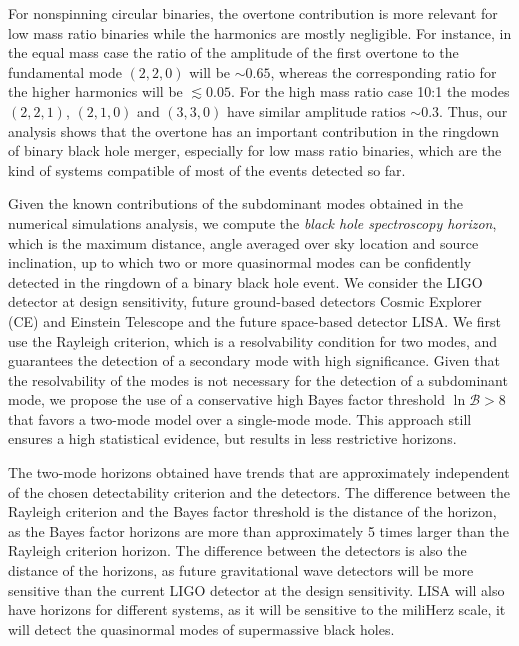 \documentclass[a4paper]{article}
\begin{document}
For nonspinning circular binaries, the overtone contribution is more relevant for low mass ratio binaries while the harmonics are mostly negligible. For instance, in the equal mass case the ratio of the amplitude of the first overtone to the fundamental mode $(2,2,0)$ will be $\sim 0.65$, whereas the corresponding ratio for the higher harmonics will be $\lesssim 0.05$. For the high mass ratio case 10:1 the modes $(2,2,1)$, $(2,1,0)$ and $(3,3,0)$ have similar amplitude ratios $\sim 0.3$.
Thus, our analysis shows that the overtone has an important contribution in the ringdown of binary black hole merger, especially for low mass ratio binaries, which are the kind of systems compatible of most of the events detected so far.

Given the known contributions of the subdominant modes obtained in the numerical simulations analysis, we compute the \emph{black hole spectroscopy horizon}, which is the maximum distance, angle averaged over sky location and source inclination, up to which two or more quasinormal modes can be confidently detected in the ringdown of a binary black hole event.
We consider the LIGO detector at design sensitivity, future ground-based detectors Cosmic Explorer (CE) and Einstein Telescope and the future space-based detector LISA.
We first use the Rayleigh criterion, which is a resolvability condition for two modes, and guarantees the detection of a secondary mode with high significance.
Given that the resolvability of the modes is not necessary for the detection of a subdominant mode, we propose the use of a conservative high Bayes factor threshold $\ln \mathcal{B} > 8$ that favors a two-mode model over a single-mode mode.
This approach still ensures a high statistical evidence, but results in less restrictive horizons. 

The two-mode horizons obtained have trends that are approximately independent of the chosen detectability criterion and the detectors.
The difference between the Rayleigh criterion and the Bayes factor threshold is the distance of the horizon, as the Bayes factor horizons are more than approximately 5 times larger than the Rayleigh criterion horizon.
The difference between the detectors is also the distance of the horizons, as future gravitational wave detectors will be more sensitive than the current LIGO detector at the design sensitivity. 
LISA will also have horizons for different systems, as it will be sensitive to the miliHerz scale, it will detect the quasinormal modes of supermassive black holes.
\end{document}
